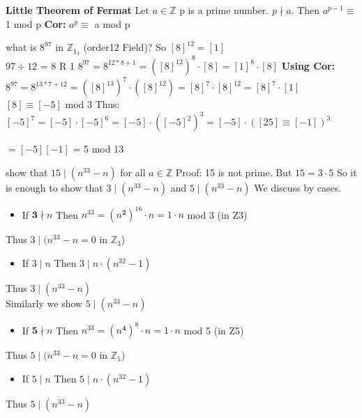 \documentclass{article}
\newcommand\Z{\ensuremath{\mathbb{Z}}}
\begin{document}
\begin{theorem}
    
    \textbf{Little Theorem of Fermat}
    \newline
    Let $a \in \Z$ p is a prime number. $p \nmid a.$
    Then $a^{p-1} \equiv$ 1 mod p
    \newline
    \textbf{Cor:} $a^{p} \equiv$ a mod p
\end{theorem}
\begin{Example}
    what is $8^{97}$ in $\Z_1_3$ (order12 Field)?
    \newline
    So $[8]^{12}=[1]$
    \\ $97\div 12$ = 8 R 1
    \newline
    $8^{97}=8^{12*8+1}=([8]^{12})^8\cdot[8] = [1]^8\cdot[8]$
    \newline
    \newline
    \textbf{Using Cor:}
     $8^{97}=8^{13*7+12}=([8]^{13})^7\cdot([8]^{12}) = [8]^7\cdot[8]^{12} = [8]^7\cdot[1]$
     \newline
     $[8]\equiv[-5]$ mod 3
     \newline
     Thus:
     \newline
     $[-5]^7 = [-5]\cdot[-5]^6 = [-5]\cdot([-5]^2)^3 = [-5]\cdot([25]\equiv[-1])^3$
     
     \setlength\parindent{24pt} $= [-5][-1]$ = 5 mod 13
\end{Example}
\begin{Example}
    show that $15\mid(n^{33}-n)$ for all $a \in \Z$
    \newline
    Proof: 15 is not prime.
    \newline
    But $15 = 3\cdot5$
    \newline
    So it is enough to show that $3\mid (n^{33}-n)$ and $5\mid(n^{33}-n)$
    \newline
    We discuss by cases. 
    \begin{itemize}
        \item If $\textbf{3}\nmid n$ Then $n^{33} = (n^\textbf{2})^{16}\cdot n = 1\cdot n$ mod 3 (in Z3)
    \end{itemize}
    \hspace*{0.8cm} Thus $3\mid (n^{33} - n = 0 $ in $\Z_3$) 
    \begin{itemize}
        \item If $3\mid n$ Then $3\mid n\cdot (n^{32}-1)$
    \end{itemize}
    \hspace*{0.8cm} Thus $3\mid (n^{33}-n)$
    \\
    Similarly we show $5\mid(n^{33}-n)$
    \begin{itemize}
        \item If $\textbf{5}\nmid n$ Then $n^{33} = (n^\textbf{4})^8\cdot n = 1 \cdot n$ mod 5 (in Z5)
    \end{itemize}
    \hspace*{0.8cm} Thus $5 \mid (n^{33} - n = 0 $ in $\Z_5$) 
    \begin{itemize}
        \item If $5\mid n$ Then $5\mid n\cdot (n^{32}-1)$
    \end{itemize}
    \hspace*{0.8cm} Thus $5\mid (n^{33}-n)$
\end{Example}
\end{document}
